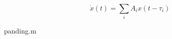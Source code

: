 \documentclass[11pt,twoside,a4paper]{article}
\begin{document}
$$\dot{x}(t)=\sum_iA_ix(t-\tau_i)$$

panding.m
\end{document}
